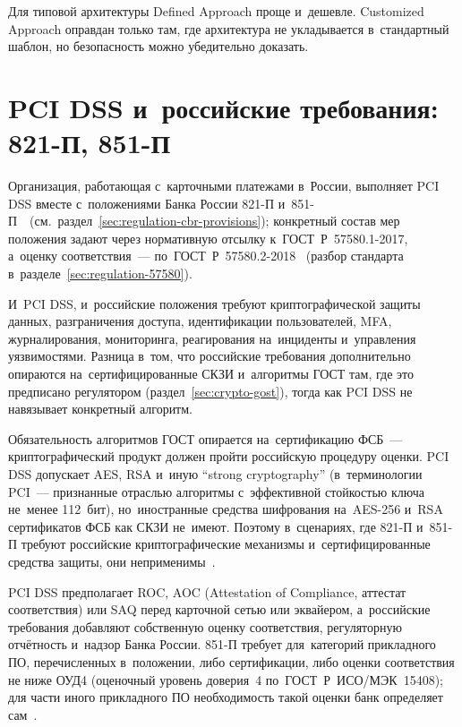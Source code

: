 Для типовой архитектуры Defined Approach проще и~дешевле. Customized Approach
оправдан только там, где архитектура не укладывается в~стандартный шаблон, но
безопасность можно убедительно доказать.

\section{PCI DSS и~российские требования: 821-П, 851-П}\label{sec:pci-russian}

Организация, работающая с~карточными платежами в~России, выполняет PCI DSS
вместе с~положениями Банка России 821-П и~851-П~\cite{cbr-821p,cbr-851p}~(см.~раздел~\ref{sec:regulation-cbr-provisions});
конкретный состав мер положения задают через нормативную отсылку
к~ГОСТ~Р~57580.1-2017, а~оценку соответствия~--- по~ГОСТ~Р~57580.2-2018%
\cite{gost-57580-1,gost-57580-2}~(разбор стандарта
в~разделе~\ref{sec:regulation-57580}).

И~PCI DSS, и~российские положения требуют криптографической защиты данных,
разграничения доступа, идентификации пользователей, MFA, журналирования,
мониторинга, реагирования на~инциденты и~управления уязвимостями. Разница
в~том, что российские требования дополнительно опираются на~сертифицированные
СКЗИ и~алгоритмы ГОСТ там, где это предписано регулятором
(раздел~\ref{sec:crypto-gost}), тогда как PCI DSS не навязывает конкретный
алгоритм.

Обязательность алгоритмов ГОСТ опирается на~сертификацию ФСБ~---
криптографический продукт должен пройти российскую процедуру оценки. PCI DSS
допускает AES, RSA и~иную \enquote{strong cryptography} (в~терминологии
  PCI~--- признанные отраслью алгоритмы с~эффективной стойкостью ключа
не~менее 112~бит), но~иностранные средства шифрования на~AES-256 и~RSA
сертификатов ФСБ как СКЗИ не~имеют. Поэтому в~сценариях, где 821-П и~851-П требуют российские
криптографические механизмы и~сертифицированные средства защиты, они
неприменимы~\cite{cbr-821p,cbr-851p}.

PCI DSS предполагает ROC, AOC (Attestation of
Compliance, аттестат соответствия) или SAQ перед карточной сетью или эквайером,
а~российские требования добавляют собственную оценку соответствия, регуляторную
отчётность и~надзор Банка России. 851-П требует для~категорий прикладного ПО,
перечисленных в~положении, либо сертификации, либо оценки соответствия не ниже
ОУД4 (оценочный уровень доверия~4 по~ГОСТ~Р~ИСО/МЭК~15408); для части иного
прикладного ПО необходимость такой оценки банк определяет сам~\cite{cbr-851p}.

